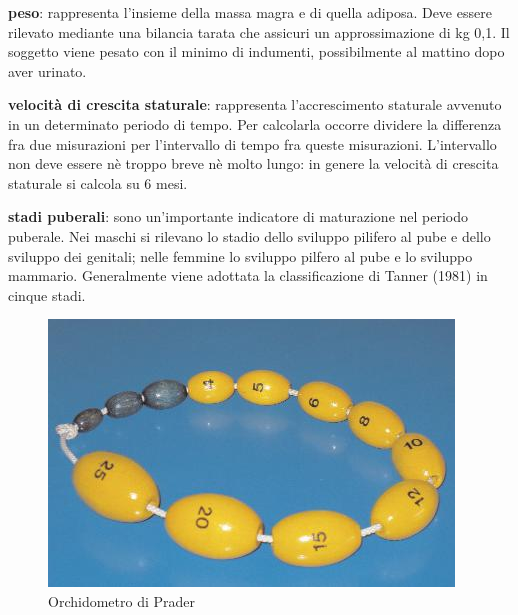 \textbf{peso}: rappresenta l'insieme della massa magra e di quella adiposa. Deve essere rilevato mediante una bilancia tarata che assicuri un approssimazione di kg 0,1. Il soggetto viene pesato con il minimo di indumenti, possibilmente al mattino dopo aver urinato.


\textbf{velocità di crescita staturale}: rappresenta l'accrescimento staturale avvenuto in un determinato periodo di tempo. Per calcolarla occorre dividere la differenza fra due misurazioni per l'intervallo di tempo fra queste misurazioni. L'intervallo non deve essere nè troppo breve nè molto lungo: in genere la velocità di crescita staturale si calcola su 6 mesi.


\textbf{stadi puberali}: sono un'importante indicatore di maturazione nel periodo puberale. Nei maschi si rilevano lo stadio dello sviluppo pilifero al pube e dello sviluppo dei genitali; nelle femmine lo sviluppo pilfero al pube e lo sviluppo mammario. Generalmente viene adottata la classificazione di Tanner (1981) in cinque stadi.%




\begin{figure}[h]
  \begin{center}
	\includegraphics[scale=0.75]{grafici/orchidometro.jpg}
  \end{center}
  \caption{Orchidometro di Prader}
\end{figure}

